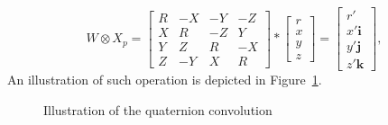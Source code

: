 \documentclass[a4paper]{article}
\def\i{\textbf{i}}
\def\j{\textbf{j}}
\begin{document}
\begin{equation}
W \otimes X_p =
\begin{bmatrix}
   R & -X & -Y & -Z \\
   X & R & -Z & Y \\
   Y & Z & R & -X \\
   Z & -Y & X & R 
\end{bmatrix}
* 
\begin{bmatrix}
    r \\ x \\ y \\ z 
\end{bmatrix}
=
\begin{bmatrix}
    r' \\ x'\i \\ y'\j \\ z'\textbf{k} 
\end{bmatrix},
\end{equation}
An illustration of such operation is depicted in Figure~\ref{fig:qconv}.
\begin{figure}[h!]
 \begin{center}
\caption{Illustration of the quaternion convolution}\label{fig:qconv}
\end{center}
\end{figure}
\end{document}
